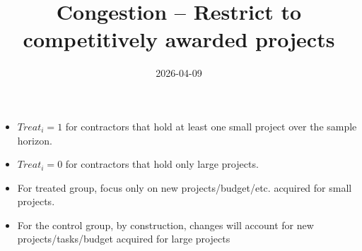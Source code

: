 \documentclass[
]{article}
\title{Congestion -- Restrict to competitively awarded projects}
\author{}
\date{\vspace{-2.5em}2026-04-09}
\providecommand{\tightlist}{%
  \setlength{\itemsep}{0pt}\setlength{\parskip}{0pt}}
\begin{document}
\maketitle

\begin{itemize}
\tightlist
\item
  \(Treat_i=1\) for contractors that hold at least one small project
  over the sample horizon.
\item
  \(Treat_i=0\) for contractors that hold only large projects.
\item
  For treated group, focus only on new projects/budget/etc. acquired for
  small projects.
\item
  For the control group, by construction, changes will account for new
  projects/tasks/budget acquired for large projects
\end{itemize}
\end{document}

